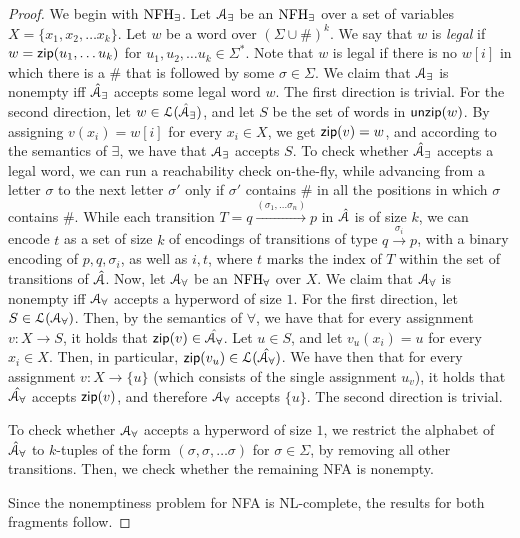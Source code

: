 \begin{proof}
We begin with $\textrm{NFH}_{\exists}$. Let $\mathcal{A}_\exists$ be an $\textrm{NFH}_{\exists}$ over a set of variables $X 
= \{x_1,x_2,\ldots x_k\}$. 
Let $w$ be a word over $(\Sigma\cup \#)^k$. We say that $w$ is {\em legal} if 
$w=\mathsf{zip}(u_1,\ldots u_k)$ for $u_1,u_2,\ldots u_k \in \Sigma^*$. 
Note that $w$ is legal if there is no $w[i]$ in which there is a $\#$ that is 
followed by some $\sigma\in \Sigma$. 
We claim that $\mathcal{A}_\exists$ is nonempty iff $\hat{\mathcal{A}}_\exists$ accepts some legal 
word $w$. The first direction is trivial. For the second direction, let 
$w\in\mathcal{L}(\hat{\mathcal{A}}_\exists)$, and let $S$ be the set of words in $\mathsf{unzip}(w)$. By 
assigning $v(x_i) = w[i]$ for every $x_i\in X$, we get $\mathsf{zip}(v) = w$, and 
according to the semantics of $\exists$, we have that $\mathcal{A}_\exists$ accepts $S$. 
To check whether $\hat{\mathcal{A}}_\exists$ accepts a legal word, we can run a 
reachability check on-the-fly, while advancing from a letter $\sigma$ to the 
next letter $\sigma'$ only if $\sigma'$ contains $\#$ in all the positions in 
which $\sigma$ contains $\#$. 
While each transition $T = q\xrightarrow{(\sigma_1,\ldots \sigma_n)} p$ in $\hat{\mathcal{A}}$ is of size $k$, we can encode $t$ as a set of size $k$ of encodings of transitions of type $q \xrightarrow {\sigma_i} p$, with a binary encoding of $p,q,\sigma_i$, as well as $i,t$, where $t$ marks the index of $T$ within the set of transitions of $\hat{\mathcal{A}}$. 
Now, let $\mathcal{A}_\forall$ be an $\textrm{NFH}_{\forall}$ over $X$. We claim that $\mathcal{A}_\forall$ is 
nonempty iff $\mathcal{A}_\forall$ accepts a hyperword of size $1$. 
For the first direction, let $S\in\mathcal{L}(\mathcal{A}_\forall)$. Then, by the semantics of 
$\forall$, we have that for every assignment $v:X\rightarrow S$, it holds that 
$\mathsf{zip}(v)\in\hat{\mathcal{A}_\forall}$. Let $u\in S$, and let $v_u(x_i) = u$ for every 
$x_i\in X$. Then, in particular, $\mathsf{zip}(v_u)\in\mathcal{L}(\hat{\mathcal{A}_\forall})$. We have 
then that for every assignment $v:X\rightarrow \{u\}$ (which consists of the 
single assignment $u_v$), it holds that $\hat{\mathcal{A}_\forall}$ accepts $\mathsf{zip}(v)$, 
and therefore $\mathcal{A}_\forall$ accepts $\{u\}$. 
The second direction is trivial. 

To check whether $\mathcal{A}_\forall$ accepts a hyperword of size $1$, we restrict the 
alphabet of $\hat{\mathcal{A}}_\forall$ to $k$-tuples of the form $(\sigma,\sigma,\ldots 
\sigma)$ for $\sigma\in \Sigma$, by removing all other transitions. Then, we 
check whether the remaining NFA is nonempty. 

Since the nonemptiness problem for NFA is NL-complete, the results for both 
fragments follow. 
\end{proof}

